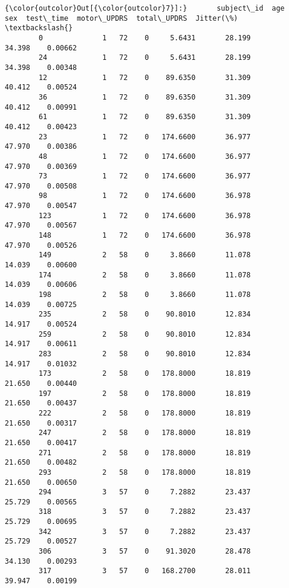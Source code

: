 \documentclass[11pt]{article}
\begin{document}
\begin{Verbatim}[commandchars=\\\{\}]
{\color{outcolor}Out[{\color{outcolor}7}]:}       subject\_id  age  sex  test\_time  motor\_UPDRS  total\_UPDRS  Jitter(\%)  \textbackslash{}
        0              1   72    0     5.6431       28.199       34.398    0.00662   
        24             1   72    0     5.6431       28.199       34.398    0.00348   
        12             1   72    0    89.6350       31.309       40.412    0.00524   
        36             1   72    0    89.6350       31.309       40.412    0.00991   
        61             1   72    0    89.6350       31.309       40.412    0.00423   
        23             1   72    0   174.6600       36.977       47.970    0.00386   
        48             1   72    0   174.6600       36.977       47.970    0.00369   
        73             1   72    0   174.6600       36.977       47.970    0.00508   
        98             1   72    0   174.6600       36.978       47.970    0.00547   
        123            1   72    0   174.6600       36.978       47.970    0.00567   
        148            1   72    0   174.6600       36.978       47.970    0.00526   
        149            2   58    0     3.8660       11.078       14.039    0.00600   
        174            2   58    0     3.8660       11.078       14.039    0.00606   
        198            2   58    0     3.8660       11.078       14.039    0.00725   
        235            2   58    0    90.8010       12.834       14.917    0.00524   
        259            2   58    0    90.8010       12.834       14.917    0.00611   
        283            2   58    0    90.8010       12.834       14.917    0.01032   
        173            2   58    0   178.8000       18.819       21.650    0.00440   
        197            2   58    0   178.8000       18.819       21.650    0.00437   
        222            2   58    0   178.8000       18.819       21.650    0.00317   
        247            2   58    0   178.8000       18.819       21.650    0.00417   
        271            2   58    0   178.8000       18.819       21.650    0.00482   
        293            2   58    0   178.8000       18.819       21.650    0.00650   
        294            3   57    0     7.2882       23.437       25.729    0.00565   
        318            3   57    0     7.2882       23.437       25.729    0.00695   
        342            3   57    0     7.2882       23.437       25.729    0.00527   
        306            3   57    0    91.3020       28.478       34.130    0.00293   
        317            3   57    0   168.2700       28.011       39.947    0.00199   

\end{Verbatim}
\end{document}
